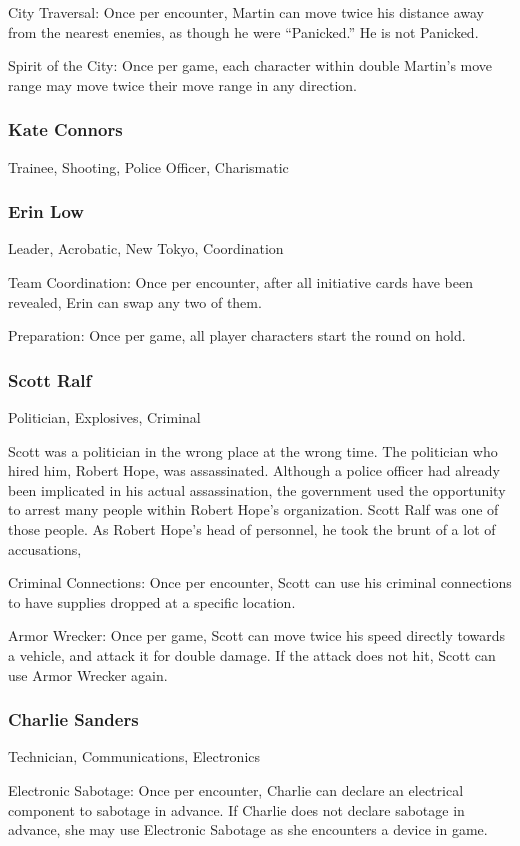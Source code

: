 \documentclass{article}
\begin{document}
\begin{multicols}{2}
City Traversal: Once per encounter, Martin can move twice his distance away from the nearest enemies, as though he were “Panicked.” He is not Panicked.

Spirit of the City: Once per game, each character within double Martin’s move range may move twice their move range in any direction.
\subsubsection{Kate Connors}
Trainee, Shooting, Police Officer, Charismatic
\subsubsection{Erin Low}
Leader, Acrobatic, New Tokyo, Coordination

Team Coordination: Once per encounter, after all initiative cards have been revealed, Erin can swap any two of them.

Preparation: Once per game, all player characters start the round on hold.
\subsubsection{Scott Ralf}
Politician, Explosives, Criminal

Scott was a politician in the wrong place at the wrong time. The politician who hired him, Robert Hope, was assassinated. Although a police officer had already been implicated in his actual assassination, the government used the opportunity to arrest many people within Robert Hope’s organization. Scott Ralf was one of those people. As Robert Hope’s head of personnel, he took the brunt of a lot of accusations,  

Criminal Connections: Once per encounter, Scott can use his criminal connections to have supplies dropped at a specific location.

Armor Wrecker: Once per game, Scott can move twice his speed directly towards a vehicle, and attack it for double damage. If the attack does not hit, Scott can use Armor Wrecker again.
\subsubsection{Charlie Sanders}
Technician, Communications, Electronics

Electronic Sabotage: Once per encounter, Charlie can declare an electrical component to sabotage in advance. If Charlie does not declare sabotage in advance, she may use Electronic Sabotage as she encounters a device in game.


\end{multicols}
\end{document}

